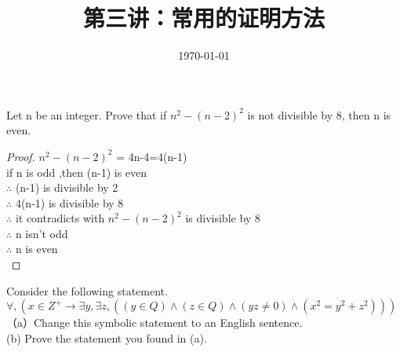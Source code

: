 \documentclass[11pt, a4paper, UTF8]{ctexart}
\title{第三讲：常用的证明方法}
\date{\today}     %
\begin{document}
\maketitle
\noplagiarism	%
\beginthishw	%

\begin{problem}[UD: 5.12]	%
  Let n be an integer. Prove that if $n^2 − (n − 2)^2$ is not divisible by 8, then n is even.
\end{problem}


\begin{proof}
  $n^2 -(n-2)^2$ = 4n-4=4(n-1)\\
  if n is odd ,then (n-1) is even\\
  $\therefore$ (n-1) is divisible by 2\\
  $\therefore$ 4(n-1) is divisible by 8\\
  $\therefore$ it contradicts with $n^2 -(n-2)^2$ is divisible by 8\\
  $\therefore$ n isn't odd \\
  $\therefore$ n is even \\
\end{proof}

\begin{problem}[UD: 5.14]
Consider the following statement.\\
$ \forall ,(x \in Z^{+} \rightarrow \exists y, \exists z,((y \in Q) \wedge (z \in Q) \wedge ( yz  \not = 0) \wedge  (x^2=y^2+z^2)))$\\
（a）Change this symbolic statement to an English sentence.\\
 (b) Prove the statement you found in (a).

\end{problem}
\end{document}

